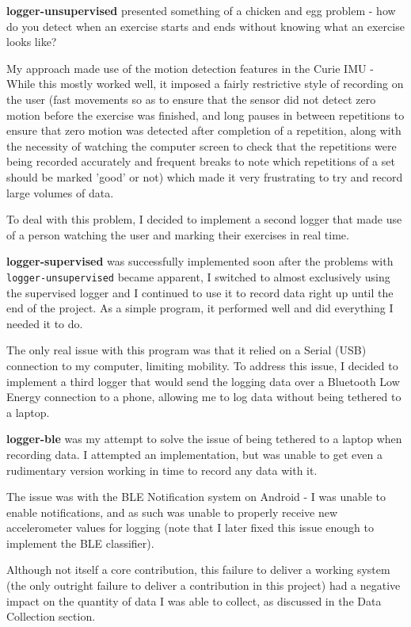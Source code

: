 \documentclass[a4paper]{article}
\begin{document}
\textbf{logger-unsupervised} presented something of a chicken and egg problem - how do you detect when an exercise starts and ends without knowing what an exercise looks like?

My approach made use of the motion detection features in the Curie IMU - 
While this mostly worked well, it imposed a fairly restrictive style of recording on the user (fast movements so as to ensure that the sensor did not detect zero motion before the exercise was finished, and long pauses in between repetitions to ensure that zero motion was detected after completion of a repetition, along with the necessity of watching the computer screen to check that the repetitions were being recorded accurately and frequent breaks to note which repetitions of a set should be marked 'good' or not) which made it very frustrating to try and record large volumes of data.

To deal with this problem, I decided to implement a second logger that made use of a person watching the user and marking their exercises in real time.

\textbf{logger-supervised} was successfully implemented soon after the problems with \lstinline{logger-unsupervised} became apparent, I switched to almost exclusively using the supervised logger and I continued to use it to record data right up until the end of the project. As a simple program, it performed well and did everything I needed it to do.

The only real issue with this program was that it relied on a Serial (USB) connection to my computer, limiting mobility. To address this issue, I decided to implement a third logger that would send the logging data over a Bluetooth Low Energy connection to a phone, allowing me to log data without being tethered to a laptop.

\textbf{logger-ble} was my attempt to solve the issue of being tethered to a laptop when recording data. I attempted an implementation, but was unable to get even a rudimentary version working in time to record any data with it.

The issue was with the BLE Notification system on Android - I was unable to enable notifications, and as such was unable to properly receive new accelerometer values for logging (note that I later fixed this issue enough to implement the BLE classifier).

Although not itself a core contribution, this failure to deliver a working system (the only outright failure to deliver a contribution in this project) had a negative impact on the quantity of data I was able to collect, as discussed in the Data Collection section. 
\end{document}
